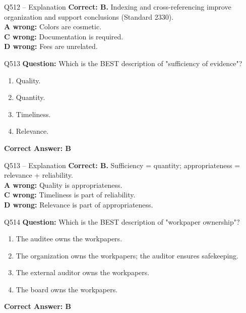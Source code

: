 \documentclass[aspectratio=169,10pt]{beamer}
\begin{document}
	\begin{frame}[t]{Q512 -- Explanation}
		\small
		\textbf{Correct: B.} Indexing and cross-referencing improve organization and support conclusions (Standard 2330). \\[4pt]
		\textbf{A wrong:} Colors are cosmetic. \\[2pt]
		\textbf{C wrong:} Documentation is required. \\[2pt]
		\textbf{D wrong:} Fees are unrelated.
	\end{frame}
	
	\begin{frame}[t]{Q513}
		\small
		\textbf{Question:} Which is the BEST description of "sufficiency of evidence"?
		\begin{enumerate}[label=\Alph*.,itemsep=1pt,topsep=2pt]
			\item Quality.
			\item Quantity.
			\item Timeliness.
			\item Relevance.
		\end{enumerate}
		\vspace{4pt}
		\textbf{Correct Answer: B}
	\end{frame}
	
	\begin{frame}[t]{Q513 -- Explanation}
		\small
		\textbf{Correct: B.} Sufficiency = quantity; appropriateness = relevance + reliability. \\[4pt]
		\textbf{A wrong:} Quality is appropriateness. \\[2pt]
		\textbf{C wrong:} Timeliness is part of reliability. \\[2pt]
		\textbf{D wrong:} Relevance is part of appropriateness.
	\end{frame}
	
	\begin{frame}[t]{Q514}
		\small
		\textbf{Question:} Which is the BEST description of "workpaper ownership"?
		\begin{enumerate}[label=\Alph*.,itemsep=1pt,topsep=2pt]
			\item The auditee owns the workpapers.
			\item The organization owns the workpapers; the auditor ensures safekeeping.
			\item The external auditor owns the workpapers.
			\item The board owns the workpapers.
		\end{enumerate}
		\vspace{4pt}
		\textbf{Correct Answer: B}
	\end{frame}
	
\end{document}
